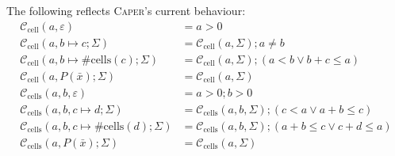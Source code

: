 \documentclass[a4paper]{article}
\makeatletter
\newcommand{\sem}[1]{\left\llbracket#1\right\rrbracket}
\newcommand{\Set}[1]{\left\{#1\right\}}
\newcommand{\Setb}[2]{\left\{#1 \, \middle| \, \begin{array}{@{}l@{}}#2\end{array} \right\}}
\newcommand{\vctx}{\Delta}
\newcommand{\pcnds}{\Pi}
\newcommand{\preds}{\Sigma}
\newcommand{\regs}{\Xi}
\newcommand{\pvars}{\Upsilon}
\makeatother
\begin{document}

The following reflects \textsc{Caper}'s current behaviour:
\begin{align*}
  \mathcal{C}_{\mathrm{cell}}(a,\varepsilon) &= a > 0 \\
  \mathcal{C}_{\mathrm{cell}}(a,b \mapsto c ; \preds) &= \mathcal{C}_{\mathrm{cell}}(a,\preds) ; a \neq b \\
  \mathcal{C}_{\mathrm{cell}}(a,b \mapsto \mathrm{\#cells}(c) ; \preds) &= \mathcal{C}_{\mathrm{cell}}(a,\preds) ; (a < b \lor b + c \leq a) \\
  \mathcal{C}_{\mathrm{cell}}(a,P(\bar{x}) ; \preds) &= \mathcal{C}_{\mathrm{cell}}(a,\preds) \\[1em]
  \mathcal{C}_{\mathrm{cells}}(a,b,\varepsilon) &= a > 0; b > 0\\
  \mathcal{C}_{\mathrm{cells}}(a,b, c \mapsto d ; \preds) &= \mathcal{C}_{\mathrm{cells}}(a,b,\preds) ; (c < a \lor a + b \leq c) \\
  \mathcal{C}_{\mathrm{cells}}(a,b, c \mapsto \mathrm{\#cells}(d) ; \preds) &= \mathcal{C}_{\mathrm{cells}}(a,b,\preds) ; (a + b \leq c \lor c + d \leq a) \\
  \mathcal{C}_{\mathrm{cells}}(a,P(\bar{x}) ; \preds) &= \mathcal{C}_{\mathrm{cells}}(a,\preds)
\end{align*}
\end{document}
